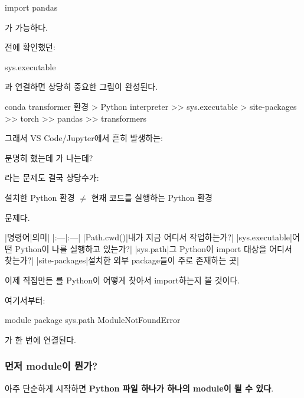 \begin{dhkcode}
import pandas
\end{dhkcode}

가 가능하다.

전에 확인했던:

\begin{dhkcode}
sys.executable
\end{dhkcode}

과 연결하면 상당히 중요한 그림이 완성된다.

\begin{dhkdir}
conda transformer 환경
> Python interpreter
>> sys.executable
> site-packages
>> torch
>> pandas
>> transformers
\end{dhkdir}

그래서 VS Code/Jupyter에서 흔히 발생하는:

\begin{dhksmry}[centered]
분명히  했는데 가 나는데?
\end{dhksmry}

라는 문제도 결국 상당수가:

\begin{dhksmry}[centered]
설치한 Python 환경 $\neq$ 현재 코드를 실행하는 Python 환경
\end{dhksmry}

문제다.

\begin{dhktable}
|명령어|의미|
|:---|:---|
|Path.cwd()|내가 지금 어디서 작업하는가?|
|sys.executable|어떤 Python이 나를 실행하고 있는가?|
|sys.path|그 Python이 import 대상을 어디서 찾는가?|
|site-packages|설치한 외부 package들이 주로 존재하는 곳|
\end{dhktable}

이제 직접만든 를 Python이 어떻게 찾아서 import하는지 볼 것이다.

여기서부터:

\begin{dhksmry}[centered]
module \ra package \ra sys.path \ra ModuleNotFoundError
\end{dhksmry}

가 한 번에 연결된다.

\subsubsection{먼저 module이 뭔가?}

아주 단순하게 시작하면 \textbf{Python 파일 하나가 하나의 module이 될 수 있다}.

